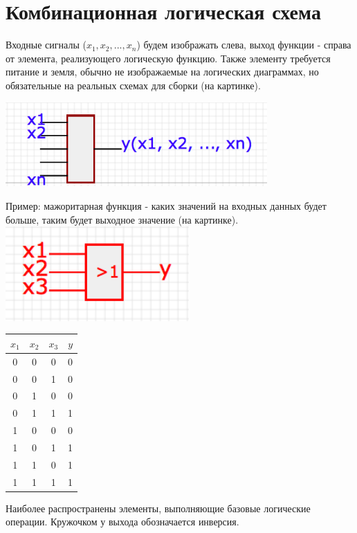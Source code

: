 \documentclass[a4paper,12pt]{report}
\begin{document}
\section{Комбинационная логическая схема}
Входные сигналы ($x_1, x_2, ..., x_n$) будем изображать слева, выход функции  - справа от элемента, реализующего логическую функцию. Также элементу требуется питание и земля, обычно не изображаемые на логических диаграммах, но обязательные на реальных схемах для сборки (на картинке).\\
\begin{center}
\includegraphics[width=10cm]{logical_element.png}
\end{center}
Пример: мажоритарная функция - каких значений на входных данных будет больше, таким будет выходное значение (на картинке).\\
\includegraphics[width=7cm]{two_or_more.png}
\begin{center}
\begin{tabular}{ c | c | c | c }
  $x_1$ & $x_2$ & $x_3$ & $y$ \\ \hline
  0 & 0 & 0 & 0 \\
  0 & 0 & 1 & 0 \\
  0 & 1 & 0 & 0 \\
  0 & 1 & 1 & 1 \\
  1 & 0 & 0 & 0 \\
  1 & 0 & 1 & 1 \\
  1 & 1 & 0 & 1\\
  1 & 1 & 1 & 1 \\
\end{tabular}
\end{center}
Наиболее распространены элементы, выполняющие базовые логические операции. Кружочком у выхода обозначается инверсия.\\
\end{document}
